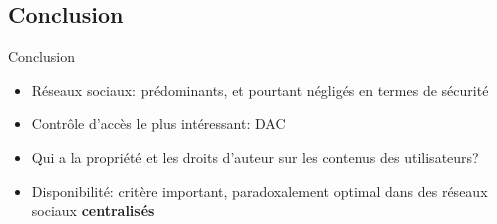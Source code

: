 \subsection{Conclusion}
\begin{frame}{Conclusion}
    \begin{itemize}
        \item Réseaux sociaux: prédominants, et pourtant négligés en termes de
            sécurité
        \item Contrôle d'accès le plus intéressant: DAC
        \item Qui a la propriété et les droits d'auteur sur les contenus
            des utilisateurs?
        \item Disponibilité: critère important, paradoxalement optimal dans des
            réseaux sociaux \textbf{centralisés}
    \end{itemize}
\end{frame}


